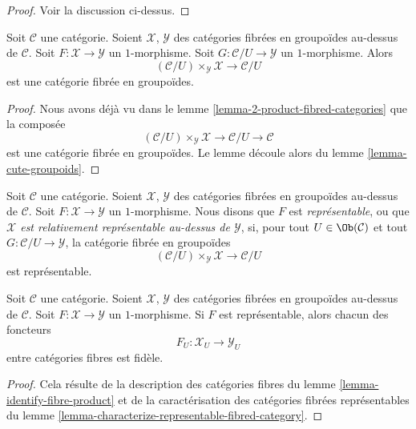\begin{proof}
Voir la discussion ci-dessus.
\end{proof}

\begin{lemma}
\label{lemma-prepare-representable-map-stack-in-groupoids}
Soit $\mathcal{C}$ une catégorie.
Soient $\mathcal{X}$, $\mathcal{Y}$ des catégories fibrées en groupoïdes
au-dessus de $\mathcal{C}$.
Soit $F : \mathcal{X} \to \mathcal{Y}$ un $1$-morphisme.
Soit $G : \mathcal{C}/U \to \mathcal{Y}$ un $1$-morphisme.
Alors
$$
(\mathcal{C}/U) \times_\mathcal{Y} \mathcal{X}
\longrightarrow
\mathcal{C}/U
$$
est une catégorie fibrée en groupoïdes.
\end{lemma}

\begin{proof}
Nous avons déjà vu dans le lemme \ref{lemma-2-product-fibred-categories}
que la composée
$$
(\mathcal{C}/U) \times_\mathcal{Y} \mathcal{X}
\longrightarrow
\mathcal{C}/U
\longrightarrow
\mathcal{C}
$$
est une catégorie fibrée en groupoïdes. Le lemme découle alors du
lemme \ref{lemma-cute-groupoids}.
\end{proof}

\begin{definition}
\label{definition-representable-map-categories-fibred-in-groupoids}
Soit $\mathcal{C}$ une catégorie.
Soient $\mathcal{X}$, $\mathcal{Y}$ des catégories fibrées en groupoïdes
au-dessus de $\mathcal{C}$.
Soit $F : \mathcal{X} \to \mathcal{Y}$ un $1$-morphisme.
Nous disons que $F$ est {\it représentable}, ou que
{\it $\mathcal{X}$ est relativement représentable au-dessus de $\mathcal{Y}$},
si, pour tout $U \in \Ob(\mathcal{C})$
et tout $G : \mathcal{C}/U \to \mathcal{Y}$,
la catégorie fibrée en groupoïdes
$$
(\mathcal{C}/U) \times_\mathcal{Y} \mathcal{X}
\longrightarrow
\mathcal{C}/U
$$
est représentable.
\end{definition}

\begin{lemma}
\label{lemma-spell-out-representable-map-stack-in-groupoids}
Soit $\mathcal{C}$ une catégorie.
Soient $\mathcal{X}$, $\mathcal{Y}$ des catégories fibrées en groupoïdes
au-dessus de $\mathcal{C}$.
Soit $F : \mathcal{X} \to \mathcal{Y}$ un $1$-morphisme.
Si $F$ est représentable, alors chacun des foncteurs
$$
F_U : \mathcal{X}_U \longrightarrow \mathcal{Y}_U
$$
entre catégories fibres est fidèle.
\end{lemma}

\begin{proof}
Cela résulte de la description des catégories fibres du
lemme \ref{lemma-identify-fibre-product} et de la caractérisation
des catégories fibrées représentables du
lemme \ref{lemma-characterize-representable-fibred-category}.
\end{proof}

